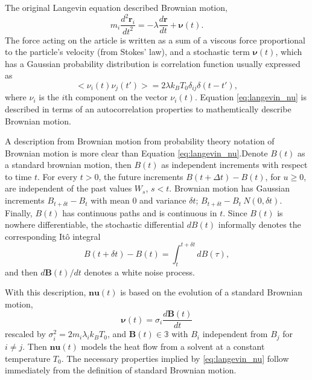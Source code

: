 The original Langevin equation\cite{langevin1908_equation} described Brownian motion,
\begin{equation}
  \label{eq:langevin}
  m_i \frac{d^2\bm{r}_i}{dt^2}
  =
  -\lambda \frac{d\bm{r}}{dt} + \bm{\nu}(t).
\end{equation}
The force acting on the article is written as a sum of a viscous force proportional to the particle's velocity (from Stokes' law), and a stochastic term $\bm{\nu}(t)$, which has a Gaussian probability distribution is correlation function usually expressed as
\begin{equation}
  \label{eq:langevin_nu}
  <\nu_i(t) \nu_j(t')> = 2 \lambda k_B T_0 \delta_{ij} \delta(t-t'),
\end{equation}
where $\nu_i$ is the $i$th component on the vector $\nu_i(t)$.  Equation \ref{eq:langevin_nu} is described in terms of an autocorrelation properties to mathemtically describe Brownian motion.

A description from Brownian motion from probability theory notation\cite{karatzas1991_sde} of Brownian motion is more clear than Equation \ref{eq:langevin_nu}.Denote $B(t)$ as a standard brownian motion, then $B(t)$ as independent increments with respect to time $t$.  For every $t > 0$, the future increments $B(t+\Delta t) - B(t)$, for $u \geq 0$, are independent of the past values $W_s$, $s < t$.  Brownian motion has Gaussian increments $B_{t+\delta t}-B_{t}$ with mean $0$ and variance $\delta t$; $B_{t+\delta t}-B_{t}~N(0,\delta t)$.
Finally, $B(t)$ has continuous paths and is continuous in $t$.
Since $B(t)$ is nowhere differentiable, the stochastic differential $dB(t)$ informally denotes the corresponding It\^{o} integral
\begin{equation}
  B(t+\delta t) - B(t) = \int_t^{t+\delta{t}} dB(\tau),
\end{equation}
and then $d\bm{B}(t)/dt$ denotes a white noise process.

With this description, $\bm{nu}(t)$ is based on the evolution of a standard Brownian motion,
\begin{equation}
  \bm{\nu}(t) = \sigma_i \frac{d\bm{B}(t)}{dt}
\end{equation} rescaled by
$\sigma_i^2 = 2 m_i \lambda_i k_B T_0$, and $\bm{B}(t) \in \mathbb{3}$ with $B_i$ independent from $B_j$ for $i \neq j$.  Then $\bm{nu}(t)$ models the heat flow from a solvent at a constant temperature $T_0$.  The necessary properties implied by \ref{eq:langevin_nu} follow immediately from the definition of standard Brownian motion.

